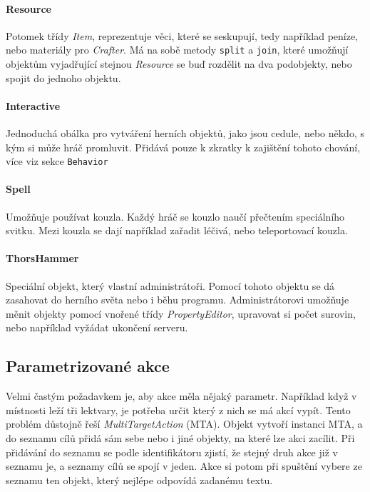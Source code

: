 \documentclass[11pt, a4paper]{article}
\def\class#1{\emph{#1}}
\begin{document}
\paragraph{Resource} Potomek třídy \class{Item}, reprezentuje věci, které se seskupují, tedy například peníze, nebo materiály pro \class{Crafter}. Má na sobě metody \texttt{split} a \texttt{join}, které umožňují objektům vyjadřující stejnou \class{Resource} se buď rozdělit na dva podobjekty, nebo spojit do jednoho objektu.

\paragraph{Interactive} Jednoduchá obálka pro vytváření herních objektů, jako jsou cedule, nebo někdo, s kým si může hráč promluvit. Přidává pouze k zkratky k zajištění tohoto chování, více viz sekce \texttt{Behavior}

\paragraph{Spell} Umožňuje používat kouzla. Každý hráč se kouzlo naučí přečtením speciálního svitku. Mezi kouzla se dají například zařadit léčivá, nebo teleportovací kouzla.

\paragraph{ThorsHammer} Speciální objekt, který vlastní administrátoři. Pomocí tohoto objektu se dá zasahovat do herního světa nebo i běhu programu. Administrátorovi umožňuje měnit objekty pomocí vnořené třídy \class{PropertyEditor}, upravovat si počet surovin, nebo například vyžádat ukončení serveru.

\subsection{Parametrizované akce}

Velmi častým požadavkem je, aby akce měla nějaký parametr. Například když v místnosti leží tři lektvary, je potřeba určit který z nich se má akcí vypít. Tento problém důstojně řeší \class{MultiTargetAction} (MTA). Objekt vytvoří instanci MTA, a do seznamu cílů přidá sám sebe nebo i jiné objekty, na které lze akci zacílit. Při přidávání do seznamu se podle identifikátoru zjistí, že stejný druh akce již v seznamu je, a seznamy cílů se spojí v jeden. Akce si potom při spuštění vybere ze seznamu ten objekt, který nejlépe odpovídá zadanému textu.
\end{document}

